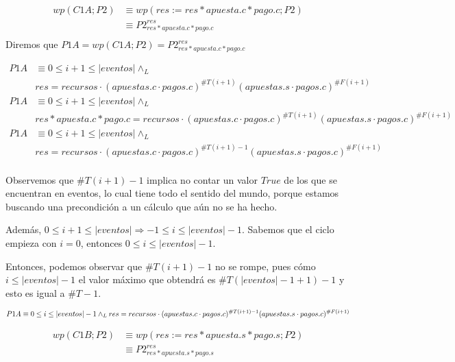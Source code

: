 \documentclass[document.tex]{subfiles}
\begin{document}
\begin{equation} \label{eq2.a}
\begin{split}
wp(C1A;P2) & \equiv wp(res := res * apuesta.c * pago.c; P2) \\
           & \equiv P2^{res}_{res * apuesta.c * pago.c} \\
\end{split}
\end{equation}
Diremos que $P1A = wp(C1A;P2) = P2^{res}_{res * apuesta.c * pago.c}$

\begin{equation} \label{eq2.a}
\begin{split}
P1A & \equiv 0\leq i+1 \leq |eventos| \land_L \\& res = recursos \cdot (apuestas.c\cdot pagos.c)^{\#T(i+1)}(apuestas.s\cdot pagos.c)^{\#F(i+1)}\\
P1A & \equiv 0\leq i+1 \leq |eventos| \land_L \\& res * apuesta.c * pago.c = recursos \cdot (apuestas.c\cdot pagos.c)^{\#T(i+1)}(apuestas.s\cdot pagos.c)^{\#F(i+1)}\\
P1A & \equiv 0\leq i+1 \leq |eventos| \land_L \\& res = recursos \cdot (apuestas.c\cdot pagos.c)^{\#T(i+1)-1}(apuestas.s\cdot pagos.c)^{\#F(i+1)}\\
\end{split}
\end{equation}

Observemos que $\#T(i+1)-1$ implica no contar un valor $True$ de los que se encuentran en eventos, lo cual tiene todo el sentido del mundo, porque estamos buscando una precondición a un cálculo que aún no se ha hecho.

Además, $0\leq i+1 \leq |eventos| \Longrightarrow -1\leq i \leq |eventos|-1$. Sabemos que el ciclo empieza con $i=0$, entonces $0\leq i \leq |eventos|-1$.

Entonces, podemos observar que $\#T(i+1)-1$ no se rompe, pues cómo $i \leq |eventos|-1$ el valor máximo que obtendrá es $\#T(|eventos|-1+1)-1$ y esto es igual a $\#T-1$.

\begin{equation} \label{P1A}
    P1A \equiv 0\leq i \leq |eventos|-1 \land_L \\ res = recursos \cdot (apuestas.c\cdot pagos.c)^{\#T(i+1)-1}(apuestas.s\cdot pagos.c)^{\#F(i+1)}\\
\end{equation}

\begin{equation} \label{eq2.a}
\begin{split}
wp(C1B;P2) & \equiv wp(res := res * apuesta.s * pago.s; P2) \\
           & \equiv P2^{res}_{res * apuesta.s * pago.s} \\
\end{split}
\end{equation}
\end{document}
